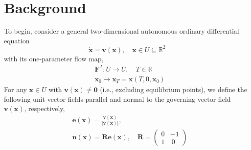\documentclass[onecolumn,3p]{elsarticle}
\begin{document}
	

	\section{Background}
	To begin, consider a general two-dimensional autonomous ordinary differential equation
	\begin{equation}
		\mathbf{\dot x} = \mathbf{v}(\mathbf{x}), \quad \mathbf{x} \in U \subseteq \mathbb{R}^2
	\end{equation}
	with its one-parameter flow map,
	\begin{equation}
		\begin{split}
			& \mathbf{F}^T : U \rightarrow U, \quad T \in \mathbb{R} \\
			& \mathbf{x}_0 \mapsto \mathbf{x}_T = \mathbf{x}(T,0,\mathbf{x}_0)
		\end{split}
	\end{equation}
	For any $\mathbf{x} \in U$ with $\mathbf{v}(\mathbf{x}) \ne \mathbf{0}$ (i.e., excluding equilibrium points), we define the following unit vector fields parallel and normal to the governing vector field $\mathbf{v}(\mathbf{x})$, respectively,
	\begin{equation}
		\begin{split}
			& \mathbf{e}(\mathbf{x}) = \frac{\mathbf{v}(\mathbf{x})}{|\mathbf{v}(\mathbf{x})|}, \\
			& \mathbf{n}(\mathbf{x}) = \mathbf{R} \mathbf{e}(\mathbf{x})
			, \quad   
			\mathbf{R} = \left(
			\begin{array}{cc}
			0 & -1 \\
			1 & ~ 0 
			\end{array}
			\right)
		\end{split}
		\label{unit_vector_fields}
	\end{equation}
	
\end{document}
